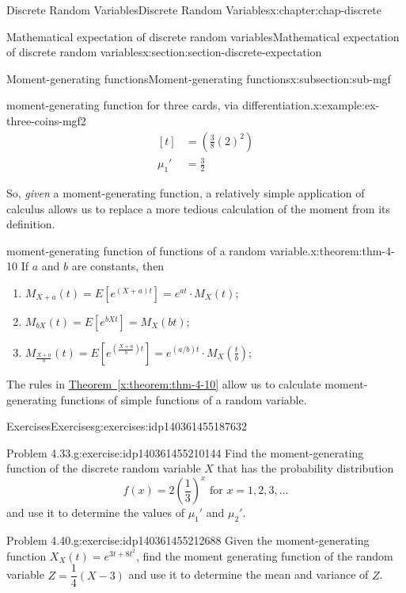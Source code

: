 \documentclass[oneside,10pt,]{book}
\newcommand{\xreffont}{\relax}
\numberwithin{equation}{section}
\newcommand{\amp}{&}
\begin{document}
\begin{chapterptx}{Discrete Random Variables}{}{Discrete Random Variables}{}{}{x:chapter:chap-discrete}
\begin{sectionptx}{Mathematical expectation of discrete random variables}{}{Mathematical expectation of discrete random variables}{}{}{x:section:section-discrete-expectation}
\begin{subsectionptx}{Moment-generating functions}{}{Moment-generating functions}{}{}{x:subsection:sub-mgf}
\begin{example}{moment-generating function for three cards, via differentiation.}{x:example:ex-three-coins-mgf2}
\begin{equation*}
\begin{aligned}[t]
\amp = \left(\frac{3}{8} (2)^2\right)\\
\mu_1' \amp = \frac{3}{2}
\end{aligned}
\end{equation*}
%
\end{example}
So, \emph{given} a moment-generating function, a relatively simple application of calculus allows us to replace a more tedious calculation of the moment from its definition.%
\begin{theorem}{moment-generating function of functions of a random variable.}{}{x:theorem:thm-4-10}%
If \(\displaystyle a\) and \(\displaystyle b\) are constants, then%
\begin{enumerate}
\item{}\(\displaystyle M_{X+a}(t) = E[e^{(X+a)t}] = e^{at} \cdot
M_X(t)\);%
\item{}\(\displaystyle M_{bX}(t) = E[e^{bXt}] = M_X(bt)\);%
\item{}\(\displaystyle M_{\frac{X+a}{b}}(t) =
E\left[e^{\left(\frac{X+a}{b}\right)t}\right] = e^{(a/b)t} \cdot
M_X\left(\frac{t}{b}\right)\);%
\end{enumerate}
%
\end{theorem}
The rules in \hyperref[x:theorem:thm-4-10]{Theorem~{\xreffont\ref{x:theorem:thm-4-10}}} allow us to calculate moment-generating functions of simple functions of a random variable.%
\end{subsectionptx}
%
%
\typeout{************************************************}
\typeout{************************************************}
%
\begin{exercises-subsection}{Exercises}{}{Exercises}{}{}{g:exercises:idp140361455187632}
\begin{divisionexercise}{1}{Problem 4.33.}{}{g:exercise:idp140361455210144}%
Find the moment-generating function of the discrete random variable \(X\) that has the probability distribution%
\begin{equation*}
f(x) =
2\left(\dfrac{1}{3}\right)^x \text{ for } x = 1, 2, 3, \dots
\end{equation*}
and use it to determine the values of \(\mu_1'\) and \(\mu_2'\).%
\end{divisionexercise}%
\begin{divisionexercise}{2}{Problem 4.40.}{}{g:exercise:idp140361455212688}%
Given the moment-generating function \(X_X(t) = e^{3t+8t^2}\), find the moment generating function of the random variable \(Z =
\dfrac{1}{4}\left(X-3\right)\) and use it to determine the mean and variance of \(Z\).%

\end{divisionexercise}
\end{exercises-subsection}
\end{sectionptx}
\end{chapterptx}
\end{document}
